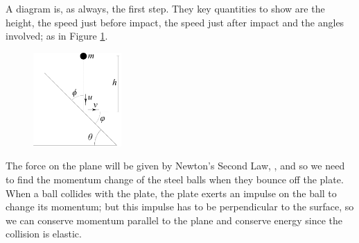 
\begin{problem}[HSC1946P1X1a] %
{%
{} 
}
{
}
{%
A diagram is, as always, the first step. They key quantities to show are the height, the speed just before impact, the speed just after impact and the angles involved; as in Figure \ref{fig:Dynamics_ball_plane_p}.

\begin{figure}[h]
	\centering
	\includegraphics[width=0.3\textwidth]{../../../figures/Dynamics_ball_plane_p.svg}
	\caption{}
	\label{fig:Dynamics_ball_plane_p}
\end{figure}

The force on the plane will be given by Newton's Second Law, , and so we need to find the momentum change of the steel balls when they bounce off the plate. When a ball collides with the plate, the plate exerts an impulse on the ball to change its momentum; but this impulse has to be perpendicular to the surface, so we can conserve momentum parallel to the plane and conserve energy since the collision is elastic.

}
\end{problem}
